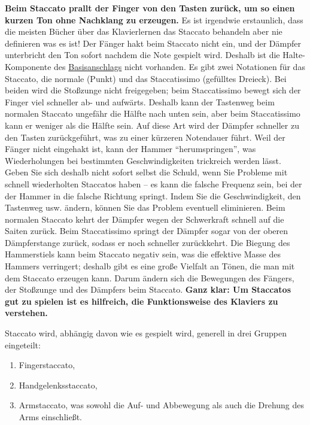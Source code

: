 \textbf{Beim Staccato prallt der Finger von den Tasten zurück, um so einen kurzen Ton ohne Nachklang zu erzeugen.}
Es ist irgendwie erstaunlich, dass die meisten Bücher über das Klavierlernen das Staccato behandeln aber nie definieren was es ist!
Der Fänger hakt beim Staccato nicht ein, und der Dämpfer unterbricht den Ton sofort nachdem die Note gespielt wird.
Deshalb ist die Halte-Komponente des \hyperref[c1iii1a1]{Basisanschlags} nicht vorhanden.
Es gibt zwei Notationen für das Staccato, die normale (Punkt) und das Staccatissimo (gefülltes Dreieck).
Bei beiden wird die Stoßzunge nicht freigegeben; beim Staccatissimo bewegt sich der Finger viel schneller ab- und aufwärts.
Deshalb kann der Tastenweg beim normalen Staccato ungefähr die Hälfte nach unten sein, aber beim Staccatissimo kann er weniger als die Hälfte sein.
Auf diese Art wird der Dämpfer schneller zu den Tasten zurückgeführt, was zu einer kürzeren Notendauer führt.
Weil der Fänger nicht eingehakt ist, kann der Hammer \enquote{herumspringen}, was Wiederholungen bei bestimmten Geschwindigkeiten trickreich werden lässt.
Geben Sie sich deshalb nicht sofort selbst die Schuld, wenn Sie Probleme mit schnell wiederholten Staccatos haben -- es kann die falsche Frequenz sein, bei der der Hammer in die falsche Richtung springt.
Indem Sie die Geschwindigkeit, den Tastenweg usw. ändern, können Sie das Problem eventuell eliminieren.
Beim normalen Staccato kehrt der Dämpfer wegen der Schwerkraft schnell auf die Saiten zurück.
Beim Staccatissimo springt der Dämpfer sogar von der oberen Dämpferstange zurück, sodass er noch schneller zurückkehrt.
Die Biegung des Hammerstiels kann beim Staccato negativ sein, was die effektive Masse des Hammers verringert;
deshalb gibt es eine große Vielfalt an Tönen, die man mit dem Staccato erzeugen kann.
Darum ändern sich die Bewegungen des Fängers, der Stoßzunge und des Dämpfers beim Staccato.
\textbf{Ganz klar: Um Staccatos gut zu spielen ist es hilfreich, die Funktionsweise des Klaviers zu verstehen.}

Staccato wird, abhängig davon wie es gespielt wird, generell in drei Gruppen eingeteilt:

\begin{enumerate}[label={(\roman*)}] 
\item \label{enum2a} Fingerstaccato,
\item \label{enum2b} Handgelenksstaccato,
\item \label{enum2c} Armstaccato, was sowohl die Auf- und Abbewegung als auch die Drehung des Arms einschließt.
\end{enumerate}

